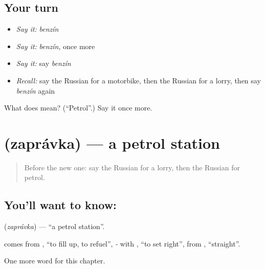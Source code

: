 \subsection*{Your turn}
\begin{itemize}
\raggedright
  \item \emph{Say it:} \emph{benzín}
  \item \emph{Say it:} \emph{benzín}, once more
  \item \emph{Say it:} say \emph{benzín}
  \item \emph{Recall:} say the Russian for a motorbike, then the Russian for a lorry, then say \emph{benzín} again
\end{itemize}

\begin{tcolorbox}[breakable,colback=teal!4,colframe=teal!35!black,title={Before you move on}]
What does  mean? (\textquotedblleft{}Petrol\textquotedblright{}.) Say it once more.
\end{tcolorbox}
\section[\texorpdfstring{\ru{заправка} (zaprávka)}{заправка (zaprávka)}]{ (zaprávka) — a petrol station}

\label{lesson:RU-C167-zapravka}



\begin{quote}
Before the new one: say the Russian for a lorry, then the Russian for petrol.
\end{quote}

\subsection*{You'll want to know: }
\textbf{} (\emph{zaprávka}) — \textquotedblleft{}a petrol station\textquotedblright{}.

\begin{cousinweb}
\textbf{} comes from \emph{}, \textquotedblleft{}to fill up, to refuel\textquotedblright{}, \emph{-} with \emph{}, \textquotedblleft{}to set right\textquotedblright{}, from \emph{}, \textquotedblleft{}straight\textquotedblright{}.
\end{cousinweb}

\begin{grammarlens}[title={What you've built}]
One more word for this chapter.
\end{grammarlens}

